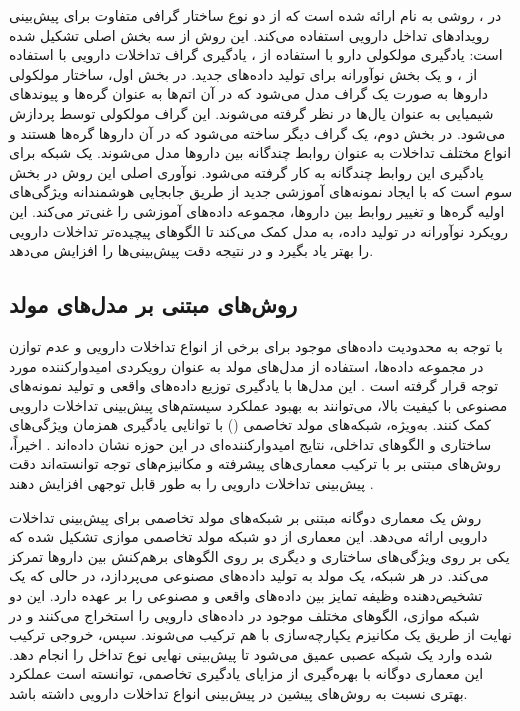 در \cite{ref_mrcgnn2023}، روشی به نام  ارائه شده است که از دو نوع ساختار گرافی متفاوت برای پیش‌بینی رویدادهای تداخل دارویی استفاده می‌کند. این روش از سه بخش اصلی تشکیل شده است: یادگیری مولکولی دارو با استفاده از ، یادگیری گراف تداخلات دارویی با استفاده از ، و یک بخش نوآورانه برای تولید داده‌های جدید. در بخش اول، ساختار مولکولی داروها به صورت یک گراف مدل می‌شود که در آن اتم‌ها به عنوان گره‌ها و پیوندهای شیمیایی به عنوان یال‌ها در نظر گرفته می‌شوند. این گراف مولکولی توسط  پردازش می‌شود. در بخش دوم، یک گراف دیگر ساخته می‌شود که در آن داروها گره‌ها هستند و انواع مختلف تداخلات به عنوان روابط چندگانه بین داروها مدل می‌شوند. یک شبکه  برای یادگیری این روابط چندگانه به کار گرفته می‌شود. نوآوری اصلی این روش در بخش سوم است که با ایجاد نمونه‌های آموزشی جدید از طریق جابجایی هوشمندانه ویژگی‌های اولیه گره‌ها و تغییر روابط بین داروها، مجموعه داده‌های آموزشی را غنی‌تر می‌کند. این رویکرد نوآورانه در تولید داده، به مدل کمک می‌کند تا الگوهای پیچیده‌تر تداخلات دارویی را بهتر یاد بگیرد و در نتیجه دقت پیش‌بینی‌ها را افزایش می‌دهد.

\subsection{روش‌های مبتنی بر مدل‌های مولد}

با توجه به محدودیت داده‌های موجود برای برخی از انواع تداخلات دارویی و عدم توازن در مجموعه داده‌ها، استفاده از مدل‌های مولد به عنوان رویکردی امیدوارکننده مورد توجه قرار گرفته است \cite{ref_yu2023}. این مدل‌ها با یادگیری توزیع داده‌های واقعی و تولید نمونه‌های مصنوعی با کیفیت بالا، می‌توانند به بهبود عملکرد سیستم‌های پیش‌بینی تداخلات دارویی کمک کنند. به‌ویژه، شبکه‌های مولد تخاصمی () با توانایی یادگیری همزمان ویژگی‌های ساختاری و الگوهای تداخلی، نتایج امیدوارکننده‌ای در این حوزه نشان داده‌اند \cite{ref_zhang2024}. اخیراً، روش‌های مبتنی بر  با ترکیب معماری‌های پیشرفته و مکانیزم‌های توجه توانسته‌اند دقت پیش‌بینی تداخلات دارویی را به طور قابل توجهی افزایش دهند \cite{ref_he2023}.

روش  \cite{ref_yu2023} یک معماری دوگانه مبتنی بر شبکه‌های مولد تخاصمی برای پیش‌بینی تداخلات دارویی ارائه می‌دهد. این معماری از دو شبکه مولد تخاصمی موازی تشکیل شده که یکی بر روی ویژگی‌های ساختاری و دیگری بر روی الگوهای برهم‌کنش بین داروها تمرکز می‌کند. در هر شبکه، یک مولد به تولید داده‌های مصنوعی می‌پردازد، در حالی که یک تشخیص‌دهنده وظیفه تمایز بین داده‌های واقعی و مصنوعی را بر عهده دارد. این دو شبکه موازی، الگوهای مختلف موجود در داده‌های دارویی را استخراج می‌کنند و در نهایت از طریق یک مکانیزم یکپارچه‌سازی با هم ترکیب می‌شوند. سپس، خروجی ترکیب شده وارد یک شبکه عصبی عمیق می‌شود تا پیش‌بینی نهایی نوع تداخل را انجام دهد. این معماری دوگانه با بهره‌گیری از مزایای یادگیری تخاصمی، توانسته است عملکرد بهتری نسبت به روش‌های پیشین در پیش‌بینی انواع تداخلات دارویی داشته باشد.

